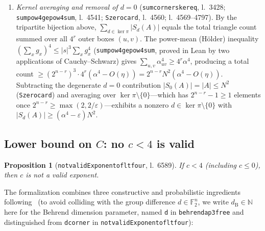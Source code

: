 \documentclass[11pt,reqno]{amsart}
\newtheorem{proposition}[theorem]{Proposition}
\theoremstyle{remark}
\newcommand{\F}{\mathbb{F}}
\newcommand{\N}{\mathbb{N}}
\newcommand{\LeanUS}{\textunderscore\hspace{0pt}}
\newcommand{\lean}[1]{{\let\_\LeanUS\texttt{#1}}}
\begin{document}
\begin{enumerate}[label=(U\arabic*),leftmargin=2.6em]
\item \emph{Kernel averaging and removal of $d = 0$} (\lean{sum\_corners\_ker\_eq}, l.~3428; \lean{sum\_pow4\_ge\_pow4\_sum}, l.~4541; \lean{S\_zero\_card}, l.~4560; l.~4569--4797). By the tripartite bijection above, $\sum_{d \in \ker \pi} |S_d(A)|$ equals the total triangle count summed over all $4^r$ outer boxes $(u, v)$. The power-mean (H\"older) inequality $(\sum_x g_x)^4 \le |s|^3 \sum_x g_x^4$ (\lean{sum\_pow4\_ge\_pow4\_sum}, proved in Lean by two applications of Cauchy--Schwarz) gives $\sum_{u,v} \alpha_{uv}^4 \ge 4^r \alpha^4$, producing a total count $\ge (2^{n-r})^3 \cdot 4^r (\alpha^4 - O(\eta)) = 2^{n-r} N^2 (\alpha^4 - O(\eta))$. Subtracting the degenerate $d = 0$ contribution $|S_0(A)| = |A| \le N^2$ (\lean{S\_zero\_card}) and averaging over $\ker \pi \setminus \{0\}$---which has $2^{n-r} - 1 \ge 1$ elements once $2^{n-r} \ge \max(2, 2/\varepsilon)$---exhibits a nonzero $d \in \ker \pi \setminus \{0\}$ with $|S_d(A)| \ge (\alpha^4 - \varepsilon) N^2$.
\end{enumerate}

\subsection{Lower bound on \texorpdfstring{$C$}{C}: no \texorpdfstring{$c < 4$}{c < 4} is valid}

\begin{proposition}[\lean{not\_validExponent\_of\_lt\_four}, l.~6589]\label{prop:lower}
If $c < 4$ (including $c \le 0$), then $c$ is not a valid exponent.
\end{proposition}

The formalization combines three constructive and probabilistic ingredients following~\cite{Mandache,FSSSZ} (to avoid colliding with the group difference $d \in \F_2^n$, we write $d_{\mathrm{B}} \in \N$ here for the Behrend dimension parameter, named \lean{d} in \lean{behrend\_ap3\_free} and distinguished from \lean{d\_corner} in \lean{not\_validExponent\_of\_lt\_four}):
\end{document}

